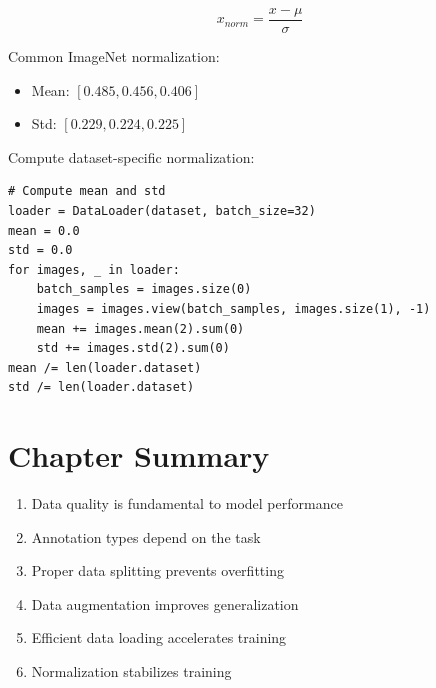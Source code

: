 \begin{equation}
x_{norm} = \frac{x - \mu}{\sigma}
\end{equation}

Common ImageNet normalization:
\begin{itemize}
    \item Mean: $[0.485, 0.456, 0.406]$
    \item Std: $[0.229, 0.224, 0.225]$
\end{itemize}

Compute dataset-specific normalization:
\begin{verbatim}
# Compute mean and std
loader = DataLoader(dataset, batch_size=32)
mean = 0.0
std = 0.0
for images, _ in loader:
    batch_samples = images.size(0)
    images = images.view(batch_samples, images.size(1), -1)
    mean += images.mean(2).sum(0)
    std += images.std(2).sum(0)
mean /= len(loader.dataset)
std /= len(loader.dataset)
\end{verbatim}

\section{Chapter Summary}

\begin{enumerate}
    \item Data quality is fundamental to model performance
    \item Annotation types depend on the task
    \item Proper data splitting prevents overfitting
    \item Data augmentation improves generalization
    \item Efficient data loading accelerates training
    \item Normalization stabilizes training
\end{enumerate}
